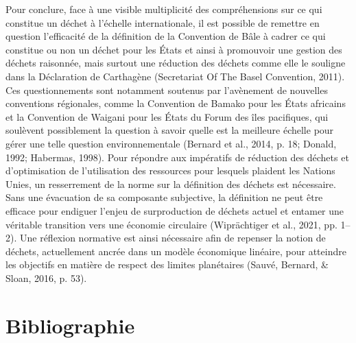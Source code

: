 \documentclass[12pt]{ulaval}
\begin{document}
Pour conclure, face à une visible multiplicité des compréhensions sur ce qui constitue un déchet à l'échelle internationale, il est possible de remettre en question l'efficacité de la définition de la Convention de Bâle à cadrer ce qui constitue ou non un déchet pour les États et ainsi à promouvoir une gestion des déchets raisonnée, mais surtout une réduction des déchets comme elle le souligne dans la Déclaration de Carthagène (Secretariat Of The Basel Convention, 2011). Ces questionnements sont notamment soutenus par l'avènement de nouvelles conventions régionales, comme la Convention de Bamako pour les États africains et la Convention de Waigani pour les États du Forum des îles pacifiques, qui soulèvent possiblement la question à savoir quelle est la meilleure échelle pour gérer une telle question environnementale (Bernard et al., 2014, p. 18; Donald, 1992; Habermas, 1998). Pour répondre aux impératifs de réduction des déchets et d'optimisation de l'utilisation des ressources pour lesquels plaident les Nations Unies, un resserrement de la norme sur la définition des déchets est nécessaire. Sans une évacuation de sa composante subjective, la définition ne peut être efficace pour endiguer l'enjeu de surproduction de déchets actuel et entamer une véritable transition vers une économie circulaire (Wiprächtiger et al., 2021, pp. 1--2). Une réflexion normative est ainsi nécessaire afin de repenser la notion de déchets, actuellement ancrée dans un modèle économique linéaire, pour atteindre les objectifs en matière de respect des limites planétaires (Sauvé, Bernard, \& Sloan, 2016, p. 53).

\backmatter

\chapter*{Bibliographie}\label{bibliographie}


\noindent

\setlength{\parindent}{-0.20in}
\setlength{\leftskip}{0.20in}
\setlength{\parskip}{8pt}
\end{document}
